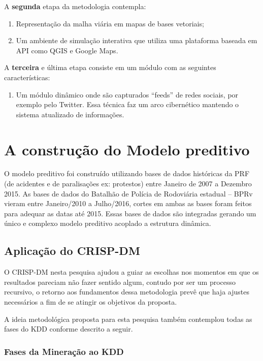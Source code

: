 A \textbf{segunda} etapa da metodologia contempla:
 \begin{enumerate}
    \item Representação da malha viária em mapas de bases vetoriais;
    \item Um ambiente de simulação interativa que utiliza uma plataforma baseada em API como QGIS e Google Maps.
  \end{enumerate}

A \textbf{terceira} e última etapa consiste em um módulo com as seguintes características:
  \begin{enumerate}
     \item Um módulo dinâmico onde são capturados ``feeds'' de redes sociais, por exemplo pelo Twitter. 
	Essa técnica faz um arco cibernético mantendo o sistema atualizado de informações.
  \end{enumerate}




\section{A construção do Modelo preditivo}

O modelo preditivo foi construído utilizando bases de dados históricas da PRF (de acidentes e de paralisações ex: protestos) entre Janeiro de 2007 a 
Dezembro 2015. As bases de dados do Batalhão de Polícia de Rodoviária estadual -- BPRv vieram entre Janeiro/2010 a Julho/2016, cortes em ambas as bases foram feitos para adequar as datas até 2015. 
Essas bases de dados são integradas gerando um único e complexo modelo preditivo acoplado a estrutura dinâmica.


\subsection{Aplicação do CRISP-DM}
O CRISP-DM nesta pesquisa ajudou a guiar as
escolhas nos momentos em que os resultados pareciam não
fazer sentido algum, contudo por ser um processo recursivo, o
retorno aos fundamentos dessa metodologia prevê que haja
ajustes necessários a fim de se atingir os objetivos da proposta.

A ideia metodológica proposta para esta pesquisa também
contemplou todas as fases do KDD conforme descrito a seguir.

\subsubsection{Fases da Mineração ao KDD}

